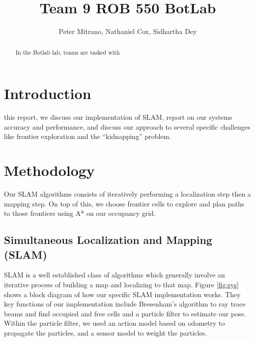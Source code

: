 \documentclass[journal]{IEEEtran}
\begin{document}
\title{Team 9 ROB 550 BotLab}

\author{Peter Mitrano, Nathaniel Cox, Sidhartha Dey}

\maketitle

\begin{abstract}
    In the Botlab lab, teams are tasked with
\end{abstract}
\IEEEpeerreviewmaketitle

\section{Introduction}
 this report, we discuss our implementation of SLAM, report on our systems accuracy and performance, and discuss our approach to several specific challenges like frontier exploration and the ``kidnapping'' problem.
    
    
\section{Methodology}

    Our SLAM algorithms consists of iteratively performing a localization step then a mapping step. On top of this, we choose frontier cells to explore and plan paths to those frontiers using A* on our occupancy grid.
    
    \subsection{Simultaneous Localization and Mapping (SLAM)}
    
        SLAM is a well established class of algorithms which generally involve an iterative process of building a map and localizing to that map. Figure \ref{fig:sys} shows a block diagram of how our specific SLAM implementation works. They key functions of our implementation include Bresenham's algorithm to ray trace beams and find occupied and free cells and a particle filter to estimate our pose. Within the particle filter, we used an action model based on odometry to propagate the particles, and a sensor model to weight the particles.
        
\end{document}
